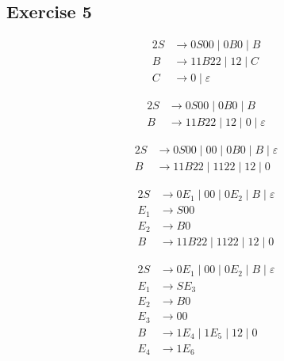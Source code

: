 \documentclass[docid=TP10]{tcom_TP}
\begin{document}
{\subsection{Exercise 5}
\begin{center}
\begin{minipage}[c]{0.3\textwidth} \begin{alignat*}{2}
	S &\rightarrow 0S00\mid 0B0\mid B\\
	B &\rightarrow 11B22\mid 12\mid C\\
	C &\rightarrow 0\mid \varepsilon
\end{alignat*} \end{minipage}%
\begin{minipage}[c]{0.3\textwidth} \begin{alignat*}{2}
	S &\rightarrow 0S00\mid 0B0\mid B\\
	B &\rightarrow 11B22\mid 12\mid 0\mid \varepsilon
\end{alignat*} \end{minipage}%
\begin{minipage}[c]{0.4\textwidth} \begin{alignat*}{2}
	S &\rightarrow 0S00\mid 00\mid 0B0\mid B\mid \varepsilon\\
	B &\rightarrow 11B22\mid 1122\mid 12\mid 0
\end{alignat*} \end{minipage}
\end{center}
\begin{center}
\begin{minipage}[c]{0.3\textwidth} \begin{alignat*}{2}
	S &\rightarrow 0E_1\mid 00\mid 0E_2\mid B\mid \varepsilon\\
	E_1 &\rightarrow S00\\
	E_2 &\rightarrow B0\\
	B &\rightarrow 11B22\mid 1122\mid 12\mid 0
\end{alignat*} \end{minipage}%
\begin{minipage}[c]{0.3\textwidth} \begin{alignat*}{2}
	S &\rightarrow 0E_1\mid 00\mid 0E_2\mid B\mid \varepsilon\\
	E_1 &\rightarrow SE_3\\
	E_2 &\rightarrow B0\\
	E_3 &\rightarrow 00\\
	B &\rightarrow 1E_4\mid 1E_5\mid 12\mid 0\\
	E_4 &\rightarrow 1E_6\\

\end{alignat*}
\end{minipage}
\end{center}}
\end{document}
